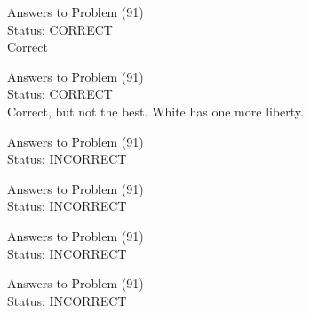 \documentclass[11pt]{article}
\begin{document}
\begin{minipage}[t]{0.5\textwidth}
  {\centering
  
  Answers to Problem (91)\\
  Status: CORRECT\\
  Correct\\
  }
\end{minipage}
\begin{minipage}[t]{0.5\textwidth}
  {\centering
  
  Answers to Problem (91)\\
  Status: CORRECT\\
  Correct, but not the best. White has one more liberty.\\
  }
\end{minipage}
\begin{minipage}[t]{0.5\textwidth}
  {\centering
  
  Answers to Problem (91)\\
  Status: INCORRECT\\
  
  }
\end{minipage}
\begin{minipage}[t]{0.5\textwidth}
  {\centering
  
  Answers to Problem (91)\\
  Status: INCORRECT\\
  
  }
\end{minipage}
\begin{minipage}[t]{0.5\textwidth}
  {\centering
  
  Answers to Problem (91)\\
  Status: INCORRECT\\
  
  }
\end{minipage}
\begin{minipage}[t]{0.5\textwidth}
  {\centering
  
  Answers to Problem (91)\\
  Status: INCORRECT\\
  
  }
\end{minipage}
\end{document}
